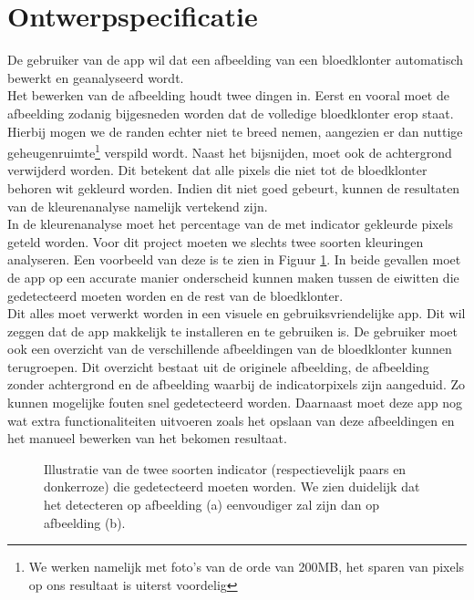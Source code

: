 \documentclass[a4paper,kulak]{kulakarticle}
\begin{document}
\section{Ontwerpspecificatie}
De gebruiker van de app wil dat een afbeelding van een bloedklonter automatisch bewerkt en geanalyseerd wordt.\\
Het bewerken van de afbeelding houdt twee dingen in. Eerst en vooral moet de afbeelding zodanig bijgesneden worden dat de volledige bloedklonter erop staat. Hierbij mogen we de randen echter niet te breed nemen, aangezien er dan nuttige geheugenruimte\footnote{We werken namelijk met foto's van de orde van 200MB, het sparen van pixels op ons resultaat is uiterst voordelig} verspild wordt. 
Naast het bijsnijden, moet ook de achtergrond verwijderd worden. Dit betekent dat alle pixels die niet tot de bloedklonter behoren wit gekleurd worden. Indien dit niet goed gebeurt, kunnen de resultaten van de kleurenanalyse namelijk vertekend zijn.\\
In de kleurenanalyse moet het percentage van de met indicator gekleurde pixels geteld worden. Voor dit project moeten we slechts twee soorten kleuringen analyseren. Een voorbeeld van deze is te zien in Figuur \ref{figuur indicators}. In beide gevallen moet de app op een accurate manier onderscheid kunnen maken tussen de eiwitten die gedetecteerd moeten worden en de rest van de bloedklonter. \\
Dit alles moet verwerkt worden in een visuele en gebruiksvriendelijke app. Dit wil zeggen dat de app makkelijk te installeren en te gebruiken is. De gebruiker moet ook een overzicht van de verschillende afbeeldingen van de bloedklonter kunnen terugroepen. Dit overzicht bestaat uit de originele afbeelding, de afbeelding zonder achtergrond en de afbeelding waarbij de indicatorpixels zijn aangeduid. Zo kunnen mogelijke fouten snel gedetecteerd worden. Daarnaast moet deze app nog wat extra functionaliteiten uitvoeren zoals het opslaan van deze afbeeldingen en het manueel bewerken van het bekomen resultaat.

\begin{figure}[H]
	\centering
	\qquad
	
	\caption{Illustratie van de twee soorten indicator (respectievelijk paars en donkerroze) die gedetecteerd moeten worden. We zien duidelijk dat het detecteren op afbeelding (a) eenvoudiger zal zijn dan op afbeelding (b).}
	\label{figuur indicators}
\end{figure}
\end{document}
